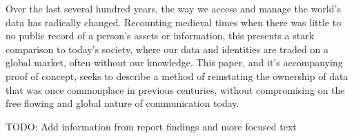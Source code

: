 \abstract

\thispagestyle{plain}
\setcounter{page}{1}

Over the last several hundred years, the way we access and manage the world's data has radically changed. Recounting medieval times when there was little to no public record of a person's assets or information, this presents a stark comparison to today's society, where our data and identities are traded on a global market, often without our knowledge. This paper, and it's accompanying proof of concept, seeks to describe a method of reinstating the ownership of data that was once commonplace in previous centuries, without compromising on the free flowing and global nature of communication today.

TODO: Add information from report findings and more focused text
